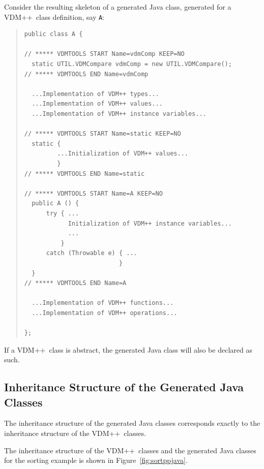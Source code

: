 \documentclass[\pformat,11pt]{article}
\newcommand{\VDM}{VDM++}
\begin{document}
Consider the resulting skeleton of a generated Java class, generated
for a \VDM\ class definition, say {\tt A}: 

\begin{quote}
\begin{verbatim}
public class A {

// ***** VDMTOOLS START Name=vdmComp KEEP=NO
  static UTIL.VDMCompare vdmComp = new UTIL.VDMCompare();
// ***** VDMTOOLS END Name=vdmComp

  ...Implementation of VDM++ types...
  ...Implementation of VDM++ values... 
  ...Implementation of VDM++ instance variables... 

// ***** VDMTOOLS START Name=static KEEP=NO
  static {
         ...Initialization of VDM++ values...
         }
// ***** VDMTOOLS END Name=static

// ***** VDMTOOLS START Name=A KEEP=NO
  public A () { 
      try { ...
            Initialization of VDM++ instance variables...
            ...
          }
      catch (Throwable e) { ...
                          }
  }
// ***** VDMTOOLS END Name=A

  ...Implementation of VDM++ functions... 
  ...Implementation of VDM++ operations... 

};
\end{verbatim}
\end{quote}

If a \VDM\ class is abstract, the generated Java class
will also be declared as such. 

\subsection{Inheritance Structure of the Generated Java Classes}
\label{inheritance}
The inheritance structure of the generated Java classes corresponds
exactly to the inheritance structure of the \VDM\ classes. 

The inheritance structure of the \VDM\ classes and the generated Java
classes for the sorting example is shown in Figure~\ref{fig:sortppjava}.
\end{document}
